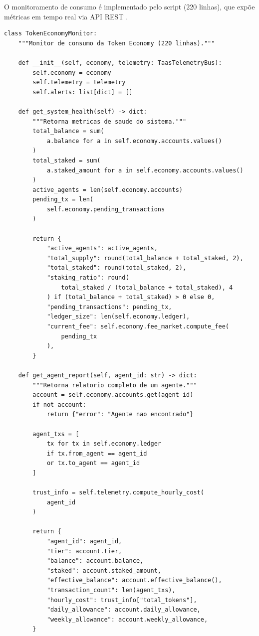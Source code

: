 O monitoramento de consumo é implementado pelo script
 (220 linhas), que expõe
métricas em tempo real via API REST \cite{opencode2026token}.

\begin{lstlisting}[caption={Monitor de consumo da Token Economy},
                  label={lst:token-monitor}]
class TokenEconomyMonitor:
    """Monitor de consumo da Token Economy (220 linhas)."""

    def __init__(self, economy, telemetry: TaasTelemetryBus):
        self.economy = economy
        self.telemetry = telemetry
        self.alerts: list[dict] = []

    def get_system_health(self) -> dict:
        """Retorna metricas de saude do sistema."""
        total_balance = sum(
            a.balance for a in self.economy.accounts.values()
        )
        total_staked = sum(
            a.staked_amount for a in self.economy.accounts.values()
        )
        active_agents = len(self.economy.accounts)
        pending_tx = len(
            self.economy.pending_transactions
        )

        return {
            "active_agents": active_agents,
            "total_supply": round(total_balance + total_staked, 2),
            "total_staked": round(total_staked, 2),
            "staking_ratio": round(
                total_staked / (total_balance + total_staked), 4
            ) if (total_balance + total_staked) > 0 else 0,
            "pending_transactions": pending_tx,
            "ledger_size": len(self.economy.ledger),
            "current_fee": self.economy.fee_market.compute_fee(
                pending_tx
            ),
        }

    def get_agent_report(self, agent_id: str) -> dict:
        """Retorna relatorio completo de um agente."""
        account = self.economy.accounts.get(agent_id)
        if not account:
            return {"error": "Agente nao encontrado"}

        agent_txs = [
            tx for tx in self.economy.ledger
            if tx.from_agent == agent_id
            or tx.to_agent == agent_id
        ]

        trust_info = self.telemetry.compute_hourly_cost(
            agent_id
        )

        return {
            "agent_id": agent_id,
            "tier": account.tier,
            "balance": account.balance,
            "staked": account.staked_amount,
            "effective_balance": account.effective_balance(),
            "transaction_count": len(agent_txs),
            "hourly_cost": trust_info["total_tokens"],
            "daily_allowance": account.daily_allowance,
            "weekly_allowance": account.weekly_allowance,
        }
\end{lstlisting}

